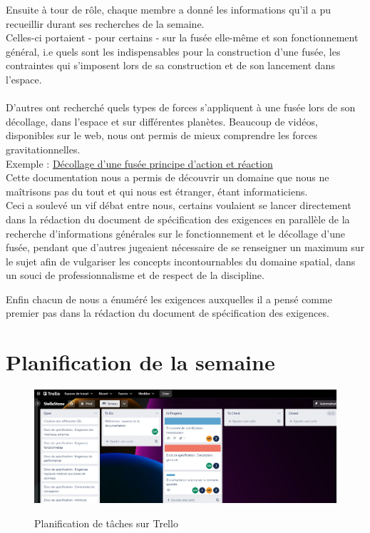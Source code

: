 \documentclass[a4paper, 12pt]{article}
\begin{document}
\newpage
Ensuite à tour de rôle, chaque membre a donné les informations qu'il a pu recueillir durant ses recherches de la semaine. \\Celles-ci portaient - pour certains - sur la fusée elle-même et son fonctionnement général, i.e quels sont les indispensables pour la construction d'une fusée, les contraintes qui s'imposent lors de sa construction et de son lancement dans l'espace. \\\\
D'autres ont recherché quels types de forces s'appliquent à une fusée lors de son décollage, dans l'espace et sur différentes planètes.
Beaucoup de vidéos, disponibles sur le web, nous ont permis de mieux comprendre les forces gravitationnelles.\\

Exemple : \href{https://www.lumni.fr/video/decollage-d-une-fusee-principe-d-action-et-reaction}{Décollage d'une fusée principe d'action et réaction}
 \\

Cette documentation nous a permis de découvrir un domaine que nous ne maîtrisons pas du tout et qui nous est étranger, étant informaticiens.\\ Ceci a soulevé un vif débat entre nous, certains voulaient se lancer directement dans la  rédaction du document de spécification des exigences en parallèle de la recherche d'informations générales sur le fonctionnement et le décollage d'une fusée, pendant que d'autres jugeaient nécessaire de se renseigner un maximum sur le sujet afin de vulgariser les concepts incontournables du domaine spatial, dans un souci de professionnalisme et de respect de la discipline.

Enfin chacun de nous a énuméré les exigences auxquelles il a pensé comme premier pas dans la rédaction du document de spécification des exigences. 


\section{Planification de la semaine}

 \begin{figure}[!h]
    \centering
    \includegraphics[scale=0.45]{trello.png}
    \label{fig:Tache_semaine}
    \caption{Planification de tâches sur Trello}
\end{figure}
\end{document}
